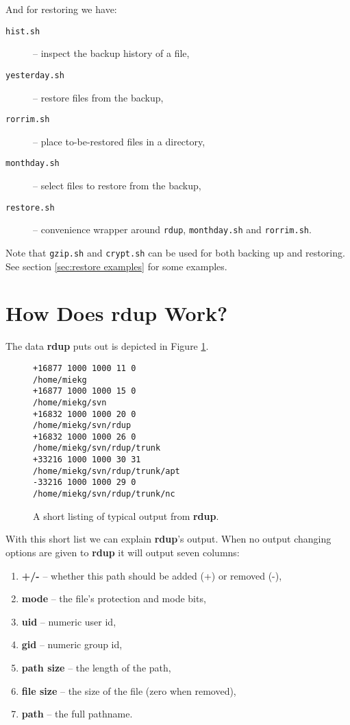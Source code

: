 \documentclass[a4paper, openany]{memoir}
\newcommand{\rdup}{\textbf{rdup}}
\newcommand{\cmd}[1]{\texttt{#1}}
\begin{document}
And for restoring we have:
\begin{description}
\item[\cmd{hist.sh}]{-- inspect the backup history of a file,}
\item[\cmd{yesterday.sh}]{-- restore files from the backup,}
\item[\cmd{rorrim.sh}]{-- place to-be-restored files in a directory,}
\item[\cmd{monthday.sh}]{-- select files to restore from the backup,}
\item[\cmd{restore.sh}]{-- convenience wrapper around \cmd{rdup},
\cmd{monthday.sh} and \cmd{rorrim.sh}.} 
\end{description}

Note that \cmd{gzip.sh} and \cmd{crypt.sh} can be used for 
both backing up and restoring. See section \ref{sec:restore examples}
for some examples.

\section{How Does \rdup{} Work?}
The data \rdup{} puts out is depicted in Figure \ref{fig:rdup output}.
\begin{figure}[hbt]
\begin{verbatim}
+16877 1000 1000 11 0 
/home/miekg
+16877 1000 1000 15 0 
/home/miekg/svn
+16832 1000 1000 20 0 
/home/miekg/svn/rdup
+16832 1000 1000 26 0 
/home/miekg/svn/rdup/trunk
+33216 1000 1000 30 31 
/home/miekg/svn/rdup/trunk/apt
-33216 1000 1000 29 0 
/home/miekg/svn/rdup/trunk/nc
\end{verbatim}
\caption{A short listing of typical output from \rdup.}
\label{fig:rdup output}
\end{figure}

With this short list we can explain \rdup's output. When no
output changing options are given to \rdup{} it will output seven
columns:
\begin{enumerate}
\item{\textbf{+/-} -- whether this path should be added (+) or removed
(-),}
\item{\textbf{mode} -- the file's protection and mode bits,}
\item{\textbf{uid} -- numeric user id,}
\item{\textbf{gid} -- numeric group id,}
\item{\textbf{path size} -- the length of the path,}
\item{\textbf{file size} -- the size of the file (zero when removed),}
\item{\textbf{path} -- the full pathname.}
\end{enumerate}
\end{document}
